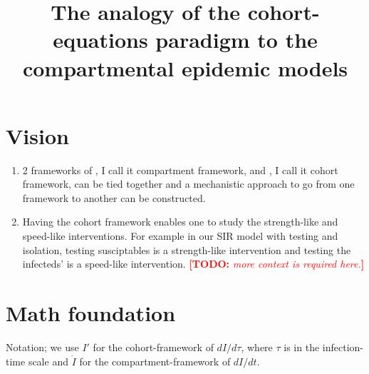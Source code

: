 \documentclass[12pt]{article}
\title{The analogy of the cohort-equations paradigm to the compartmental epidemic models}
\newcommand{\todo}[1]{\comment{red}{TODO}{#1}}
\newcommand{\comment}{\showcomment}
\newcommand{\showcomment}[3]{\textcolor{#1}{\textbf{[#2: }\textsl{#3}\textbf{]}}}
\theoremstyle{definition} %
\begin{document}
\maketitle
\linenumbers
\section{Vision}
\begin{enumerate}
\item 2 frameworks of \cite{van2002reproduction}, I call it compartment framework, and \cite{champredon2018equivalence}, I call it cohort framework, can be tied together and a mechanistic approach to go from one framework to another can be constructed.

\item Having the cohort framework enables one to study the strength-like and speed-like interventions. For example in our SIR model with testing and isolation, testing susciptables is a strength-like intervention and testing the infecteds' is a speed-like intervention. \todo{more context is required here.}
\end{enumerate}

\section{Math foundation}
Notation; we use $I'$ for the cohort-framework of $dI/d\tau$, where $\tau$ is in the infection-time scale and $\dot I$ for the compartment-framework of $dI/dt$. 
\end{document}
